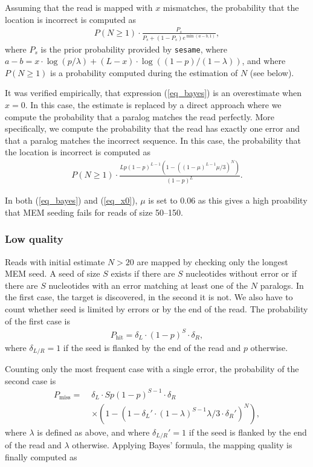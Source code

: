 \documentclass[a4,center,fleqn]{NAR}
\begin{document}
Assuming that the read is mapped with $x$ mismatches, the probability that
the location is incorrect is computed as
\begin{align}
\label{eq_bayes}
P(N \geq 1) \cdot \frac{P_s}{P_s + (1-P_s)e^{\min(a-b,1)}},
\end{align}
where $P_s$ is the prior probability provided by \texttt{sesame}, where
$a-b=x \cdot \log(p/\lambda)+(L-x) \cdot \log((1-p)/(1-\lambda))$, and
where $P(N \geq 1)$ is a probability computed during the estimation of $N$
(see below).

It was verified empirically, that expression (\ref{eq_bayes}) is an
overestimate when $x = 0$. In this case, the estimate is replaced by a
direct approach where we compute the probability that a paralog matches
the read perfectly. More specifically, we compute the probability that the
read has exactly one error and that a paralog matches the incorrect
sequence. In this case, the probability that the location is incorrect is
computed as
\begin{align}
\label{eq_x0}
P(N \geq 1) \cdot \frac{Lp(1-p)^{L-1}
\left(1-\left((1-\mu)^{L-1}\mu/3\right)^N\right)}{(1-p)^L}.
\end{align}

In both (\ref{eq_bayes}) and (\ref{eq_x0}), $\mu$ is set to 0.06 as this
gives a high proability that MEM seeding fails for reads of size 50--150.


\subsubsection{Low quality} Reads with initial estimate $N > 20$ are
mapped by checking only the longest MEM seed. A seed of size $S$ exists if
there are $S$ nucleotides without error or if there are $S$ nucleotides
with an error matching at least one of the $N$ paralogs. In the first
case, the target is discovered, in the second it is not. We also have to
count whether seed is limited by errors or by the end of the read.
The probability of the first case is
\begin{align*}
P_{\text{hit}} = \delta_L \cdot (1-p)^S \cdot \delta_R,
\end{align*}
where $\delta_{L/R} = 1$ if the seed is flanked by the end of the read and
$p$ otherwise.

Counting only the most frequent case with a single error, the probability
of the second case is
\begin{equation*}
\begin{split}
P_{\text{miss}} = \; &\delta_L \cdot Sp(1-p)^{S-1} \cdot \delta_R  \\
   &\times \left(1- \left( 1-\delta_L' \cdot(1-\lambda)^{S-1}\lambda/3
   \cdot \delta_R'\right)^N \right),
\end{split}
\end{equation*}
where $\lambda$ is defined as above, and where $\delta_{L/R}' = 1$ if the
seed is flanked by the end of the read and $\lambda$ otherwise. Applying
Bayes' formula, the mapping quality is finally computed as
\end{document}
